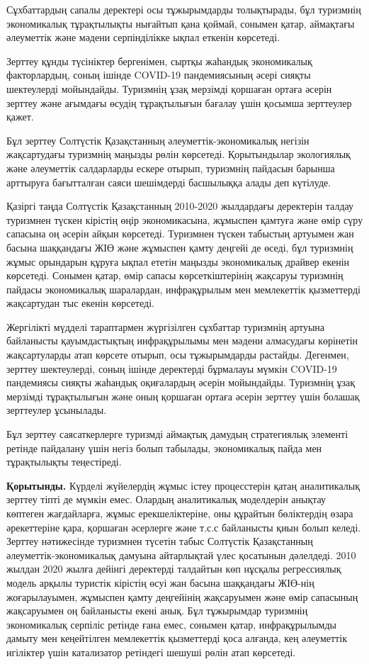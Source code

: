 Сұхбаттардың сапалы деректері осы тұжырымдарды толықтырады, бұл
туризмнің экономикалық тұрақтылықты нығайтып қана қоймай, сонымен қатар,
аймақтағы әлеуметтік және мәдени серпінділікке ықпал еткенін көрсетеді.

Зерттеу құнды түсініктер бергенімен, сыртқы жаһандық экономикалық
факторлардың, соның ішінде COVID-19 пандемиясының әсері сияқты
шектеулерді мойындайды. Туризмнің ұзақ мерзімді қоршаған ортаға әсерін
зерттеу және ағымдағы өсудің тұрақтылығын бағалау үшін қосымша
зерттеулер қажет.

Бұл зерттеу Солтүстік Қазақстанның әлеуметтік-экономикалық негізін
жақсартудағы туризмнің маңызды рөлін көрсетеді. Қорытындылар экологиялық
және әлеуметтік салдарларды ескере отырып, туризмнің пайдасын барынша
арттыруға бағытталған саяси шешімдерді басшылыққа алады деп күтілуде.

Қазіргі таңда Солтүстік Қазақстанның 2010-2020 жылдардағы деректерін
талдау туризмнен түскен кірістің өңір экономикасына, жұмыспен қамтуға
және өмір сүру сапасына оң әсерін айқын көрсетеді. Туризмнен түскен
табыстың артуымен жан басына шаққандағы ЖІӨ және жұмыспен қамту деңгейі
де өседі, бұл туризмнің жұмыс орындарын құруға ықпал ететін маңызды
экономикалық драйвер екенін көрсетеді. Сонымен қатар, өмір сапасы
көрсеткіштерінің жақсаруы туризмнің пайдасы экономикалық шаралардан,
инфрақұрылым мен мемлекеттік қызметтерді жақсартудан тыс екенін
көрсетеді.

Жергілікті мүдделі тараптармен жүргізілген сұхбаттар туризмнің артуына
байланысты қауымдастықтың инфрақұрылымы мен мәдени алмасудағы көрінетін
жақсартуларды атап көрсете отырып, осы тұжырымдарды растайды. Дегенмен,
зерттеу шектеулерді, соның ішінде деректерді бұрмалауы мүмкін COVID-19
пандемиясы сияқты жаһандық оқиғалардың әсерін мойындайды. Туризмнің ұзақ
мерзімді тұрақтылығын және оның қоршаған ортаға әсерін зерттеу үшін
болашақ зерттеулер ұсынылады.

Бұл зерттеу саясаткерлерге туризмді аймақтық дамудың стратегиялық
элементі ретінде пайдалану үшін негіз болып табылады, экономикалық пайда
мен тұрақтылықты теңестіреді.

{\bfseries Қорытынды.} Күрделі жүйелердің жұмыс істеу процесстерін қатаң
аналитикалық зерттеу тіпті де мүмкін емес. Олардың аналитикалық
моделдерін анықтау көптеген жағдайларға, жұмыс ерекшеліктеріне, оны
құрайтын бөліктердің өзара әрекеттеріне қара, қоршаған әсерлерге және
т.с.с байланысты қиын болып келеді. Зерттеу нәтижесінде туризмнен
түсетін табыс Солтүстік Қазақстанның әлеуметтік-экономикалық дамуына
айтарлықтай үлес қосатынын дәлелдеді. 2010 жылдан 2020 жылға дейінгі
деректерді талдайтын көп нұсқалы регрессиялық модель арқылы туристік
кірістің өсуі жан басына шаққандағы ЖІӨ-нің жоғарылауымен, жұмыспен
қамту деңгейінің жақсаруымен және өмір сапасының жақсаруымен оң
байланысты екені анық. Бұл тұжырымдар туризмнің экономикалық серпіліс
ретінде ғана емес, сонымен қатар, инфрақұрылымды дамыту мен кеңейтілген
мемлекеттік қызметтерді қоса алғанда, кең әлеуметтік игіліктер үшін
катализатор ретіндегі шешуші рөлін атап көрсетеді.


